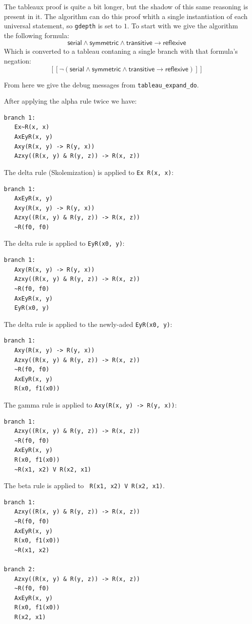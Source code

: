 \documentclass[a4paper,notitlepage]{scrartcl}
\begin{document}
The tableaux proof is quite a bit longer, but the shadow of this same 
   reasoning is present in it.
The algorithm can do this proof whith a single instantiation of each 
   universal statement, so \texttt{gdepth} is set to $1$.
To start with we give the algorithm the following formula:
\[
\textsf{serial}\land\textsf{symmetric}\land\textsf{transitive}
   \rightarrow\textsf{reflexive}
\]
Which is converted to a tableau contaning a single branch with that 
   formula's negation:
\[
[[\lnot(\textsf{serial}\land\textsf{symmetric}\land\textsf{transitive}
   \rightarrow\textsf{reflexive})]]
\]

From here we give the debug messages from \texttt{tableau\_expand\_do}.

After applying the alpha rule twice we have:
\begin{verbatim}
branch 1:
   Ex~R(x, x)
   AxEyR(x, y)
   Axy(R(x, y) -> R(y, x))
   Azxy((R(x, y) & R(y, z)) -> R(x, z))
\end{verbatim}

The   delta rule (Skolemization) is applied to \texttt{Ex~R(x, x)}:
\begin{verbatim}
branch 1:
   AxEyR(x, y)
   Axy(R(x, y) -> R(y, x))
   Azxy((R(x, y) & R(y, z)) -> R(x, z))
   ~R(f0, f0)
\end{verbatim}

The delta rule is applied to \texttt{EyR(x0, y)}:
\begin{verbatim}
branch 1:
   Axy(R(x, y) -> R(y, x))
   Azxy((R(x, y) & R(y, z)) -> R(x, z))
   ~R(f0, f0)
   AxEyR(x, y)
   EyR(x0, y)
\end{verbatim}

The delta rule is applied to the newly-aded \texttt{EyR(x0, y)}:

\begin{verbatim}
branch 1:
   Axy(R(x, y) -> R(y, x))
   Azxy((R(x, y) & R(y, z)) -> R(x, z))
   ~R(f0, f0)
   AxEyR(x, y)
   R(x0, f1(x0))
\end{verbatim}

The gamma rule is applied to \texttt{Axy(R(x, y) -> R(y, x))}:
\begin{verbatim}
branch 1:
   Azxy((R(x, y) & R(y, z)) -> R(x, z))
   ~R(f0, f0)
   AxEyR(x, y)
   R(x0, f1(x0))
   ~R(x1, x2) V R(x2, x1)
\end{verbatim}

The beta rule is applied to \texttt{~R(x1, x2) V R(x2, x1)}.

\begin{verbatim}
branch 1:
   Azxy((R(x, y) & R(y, z)) -> R(x, z))
   ~R(f0, f0)
   AxEyR(x, y)
   R(x0, f1(x0))
   ~R(x1, x2)

branch 2:
   Azxy((R(x, y) & R(y, z)) -> R(x, z))
   ~R(f0, f0)
   AxEyR(x, y)
   R(x0, f1(x0))
   R(x2, x1)
\end{verbatim}
\end{document}
